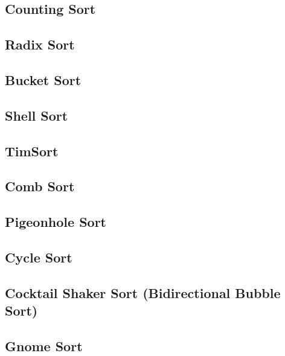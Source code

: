 \documentclass[11pt]{article}
\begin{document}
        \subsection{Counting Sort}
            

        \subsection{Radix Sort}
            

        \subsection{Bucket Sort}
            

        \subsection{Shell Sort}

        \subsection{TimSort}

        \subsection{Comb Sort}

        \subsection{Pigeonhole Sort}

        \subsection{Cycle Sort}

        \subsection{Cocktail Shaker Sort (Bidirectional Bubble Sort)}

        \subsection{Gnome Sort}
\end{document}
